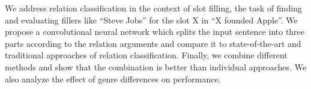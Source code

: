 We address relation classification in the context of slot filling, the task of finding and evaluating fillers like ``Steve Jobs'' for the slot X in ``X founded Apple''. We propose a convolutional neural network which splits the input sentence into three parts according to the relation arguments and compare it to state-of-the-art and traditional approaches of relation classification. Finally, we combine different methods and show that the combination is better than individual approaches. We also analyze the effect of genre differences on performance.
